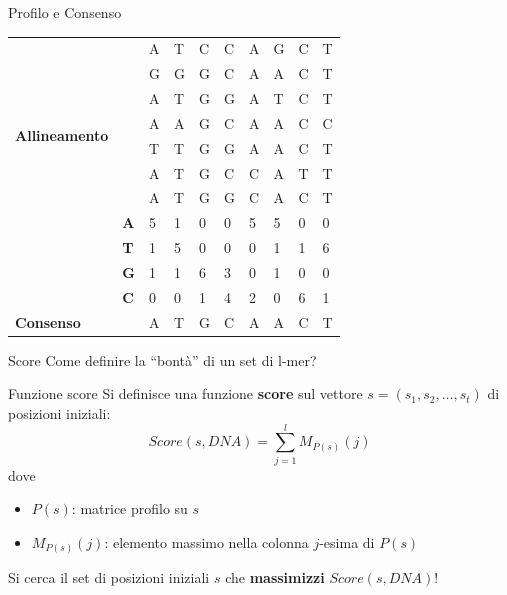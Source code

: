	\begin{frame}{Profilo e Consenso}
		\begin{center}
			\begin{tabular}{l l l l l l l l l l}
				\multirow{8}{*}{\textbf{Allineamento}} & & A & T & C & C & A & G & C & T\\
				& & G & G & G & C & A & A & C & T\\
				& & A & T & G & G & A & T & C & T\\
				& & A & A & G & C & A & A & C & C\\
				& & T & T & G & G & A & A & C & T\\
				& & A & T & G & C & C & A & T & T\\
				& & A & T & G & G & C & A & C & T\\
				\hline
				\multirow{4}{*}{\textbf{Profilo}} & \textbf{A} & 5 & 1 & 0 & 0 & 5 & 5 & 0 & 0\\
				& \textbf{T} & 1 & 5 & 0 & 0 & 0 & 1 & 1 & 6\\
				& \textbf{G} & 1 & 1 & 6 & 3 & 0 & 1 & 0 & 0\\
				& \textbf{C} & 0 & 0 & 1 & 4 & 2 & 0 & 6 & 1\\
				\hline
				\textbf{Consenso} & & A & T & G & C & A & A & C & T 
			\end{tabular}
		\end{center}
	\end{frame}
	
	\begin{frame}{Score}
		Come definire la ``bontà'' di un set di l-mer?
		\pause
		\begin{block}{Funzione score}
			Si definisce una funzione \alert{\textbf{score}} sul vettore $s=(s_1,s_2,\dots,s_t)$ di posizioni iniziali:
			\begin{equation*}
				Score(s,DNA)=\sum_{j=1}^{l}M_{P(s)}(j)
			\end{equation*}
			dove
			\begin{itemize}
				\item $P(s)$: matrice profilo su $s$
				\item $M_{P(s)}(j)$: elemento massimo nella colonna $j$-esima di $P(s)$
			\end{itemize}
		\end{block}
		\pause
		Si cerca il set di posizioni iniziali $s$ che \alert{\textbf{massimizzi}} $Score(s,DNA)$!
	\end{frame}
	
